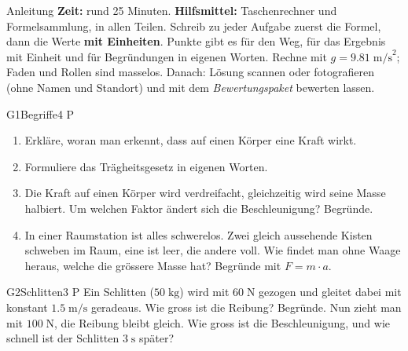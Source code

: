 \documentclass[11pt]{article}
\begin{document}

\begin{lpinfo}{Anleitung}
\textbf{Zeit:} rund 25 Minuten. \textbf{Hilfsmittel:} Taschenrechner und Formelsammlung, in allen Teilen.
Schreib zu jeder Aufgabe zuerst die Formel, dann die Werte \textbf{mit Einheiten}. Punkte gibt es für den Weg,
für das Ergebnis mit Einheit und für Begründungen in eigenen Worten. Rechne mit $g = 9.81\;\text{m/s}^2$; Faden und Rollen sind masselos.
Danach: Lösung scannen oder fotografieren (ohne Namen und Standort) und mit dem \emph{Bewertungspaket} bewerten lassen.
\end{lpinfo}


\begin{lpaufgabe}{G1}{Begriffe}{4 P}
\begin{enumerate}[label=\alph*),leftmargin=*,itemsep=2pt,topsep=2pt]
\item Erkläre, woran man erkennt, dass auf einen Körper eine Kraft wirkt.
\item Formuliere das Trägheitsgesetz in eigenen Worten.
\item Die Kraft auf einen Körper wird verdreifacht, gleichzeitig wird seine Masse halbiert. Um welchen Faktor ändert sich die Beschleunigung? Begründe.
\item In einer Raumstation ist alles schwerelos. Zwei gleich aussehende Kisten schweben im Raum, eine ist leer, die andere voll. Wie findet man ohne Waage heraus, welche die grössere Masse hat? Begründe mit $F = m \cdot a$.
\end{enumerate}
\end{lpaufgabe}

\begin{lpaufgabe}{G2}{Schlitten}{3 P}
Ein Schlitten ($50\;\text{kg}$) wird mit $60\;\text{N}$ gezogen und gleitet dabei mit konstant $1.5\;\text{m/s}$ geradeaus.
Wie gross ist die Reibung? Begründe. Nun zieht man mit $100\;\text{N}$, die Reibung bleibt gleich. Wie gross ist die Beschleunigung, und wie schnell ist der Schlitten $3\;\text{s}$ später?
\end{lpaufgabe}
\end{document}

